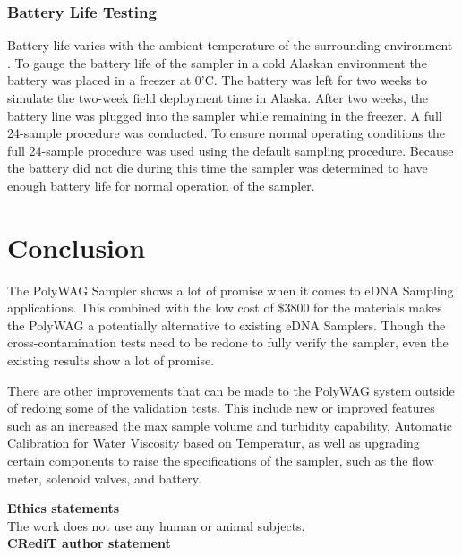 \documentclass[11pt, letterpaper]{article}
\begin{document}
\subsubsection{Battery Life Testing}
Battery life varies with the ambient temperature of the surrounding environment \cite{art:Battery}. To gauge the battery life of the sampler in a cold Alaskan environment the battery was placed in a freezer at 0’C. The battery was left for two weeks to simulate the two-week field deployment time in Alaska. After two weeks, the battery line was plugged into the sampler while remaining in the freezer. A full 24-sample procedure was conducted. To ensure normal operating conditions the full 24-sample procedure was used using the default sampling procedure. Because the battery did not die during this time the sampler was determined to have enough battery life for normal operation of the sampler.


\section{Conclusion}

The PolyWAG Sampler shows a lot of promise when it comes to eDNA Sampling applications. This combined with the low cost of \$3800 for the materials makes the PolyWAG a potentially alternative to existing eDNA Samplers. Though the cross-contamination tests need to be redone to fully verify the sampler, even the existing results show a lot of promise. 
\newline\par
There are other improvements that can be made to the PolyWAG system outside of redoing some of the validation tests. This include new or improved features such as an increased the max sample volume and turbidity capability, Automatic Calibration for Water Viscosity based on Temperatur, as well as upgrading certain components to raise the specifications of the sampler, such as the flow meter, solenoid valves, and battery. 


\par\noindent\newline
\textbf{Ethics statements}\\
\noindent
The work does not use any human or animal subjects.\\


\noindent
\textbf{CRediT author statement}\\
\end{document}
